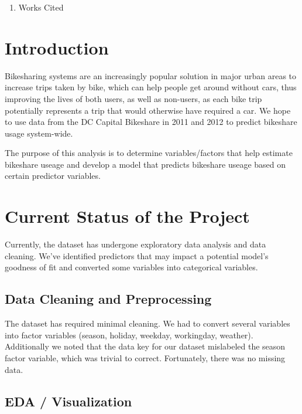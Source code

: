 \documentclass[
]{article}
\providecommand{\tightlist}{%
  \setlength{\itemsep}{0pt}\setlength{\parskip}{0pt}}
\begin{document}
\begin{enumerate}
\def\labelenumi{\Roman{enumi}.}
\setcounter{enumi}{5}
\tightlist
\item
  Works Cited
\end{enumerate}

\hypertarget{introduction}{%
\section{Introduction}\label{introduction}}

Bikesharing systems are an increasingly popular solution in major urban
areas to increase trips taken by bike, which can help people get around
without cars, thus improving the lives of both users, as well as
non-users, as each bike trip potentially represents a trip that would
otherwise have required a car. We hope to use data from the DC Capital
Bikeshare in 2011 and 2012 to predict bikeshare usage system-wide.

The purpose of this analysis is to determine variables/factors that help
estimate bikeshare useage and develop a model that predicts bikeshare
useage based on certain predictor variables.

\hypertarget{current-status-of-the-project}{%
\section{Current Status of the
Project}\label{current-status-of-the-project}}

Currently, the dataset has undergone exploratory data analysis and data
cleaning. We've identified predictors that may impact a potential
model's goodness of fit and converted some variables into categorical
variables.

\hypertarget{data-cleaning-and-preprocessing}{%
\subsection{Data Cleaning and
Preprocessing}\label{data-cleaning-and-preprocessing}}

The dataset has required minimal cleaning. We had to convert several
variables into factor variables (season, holiday, weekday, workingday,
weather). Additionally we noted that the data key for our dataset
mislabeled the season factor variable, which was trivial to correct.
Fortunately, there was no missing data.

\hypertarget{eda-visualization}{%
\subsection{EDA / Visualization}\label{eda-visualization}}
\end{document}
